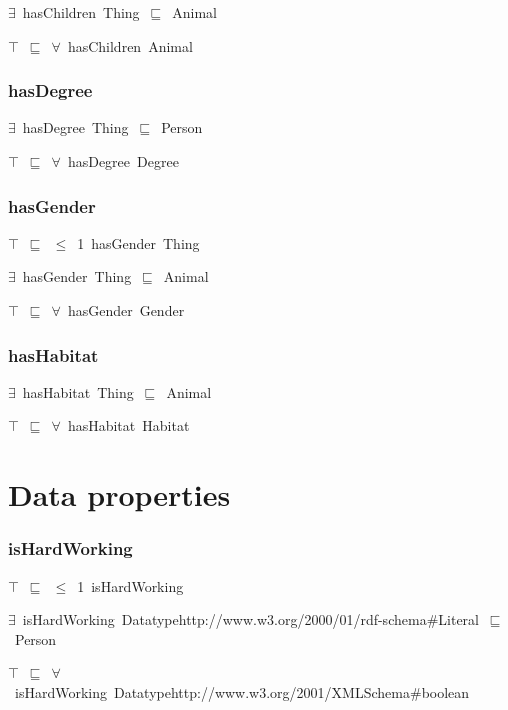 \documentclass{article}
\begin{document}
\ensuremath{\exists}~hasChildren~Thing~\ensuremath{\sqsubseteq}~Animal

\ensuremath{\top}~\ensuremath{\sqsubseteq}~\ensuremath{\forall}~hasChildren~Animal

\subsubsection*{hasDegree}

\ensuremath{\exists}~hasDegree~Thing~\ensuremath{\sqsubseteq}~Person

\ensuremath{\top}~\ensuremath{\sqsubseteq}~\ensuremath{\forall}~hasDegree~Degree

\subsubsection*{hasGender}

\ensuremath{\top}~\ensuremath{\sqsubseteq}~\ensuremath{\leq}~1~hasGender~Thing

\ensuremath{\exists}~hasGender~Thing~\ensuremath{\sqsubseteq}~Animal

\ensuremath{\top}~\ensuremath{\sqsubseteq}~\ensuremath{\forall}~hasGender~Gender

\subsubsection*{hasHabitat}

\ensuremath{\exists}~hasHabitat~Thing~\ensuremath{\sqsubseteq}~Animal

\ensuremath{\top}~\ensuremath{\sqsubseteq}~\ensuremath{\forall}~hasHabitat~Habitat

\section*{Data properties}\subsubsection*{isHardWorking}

\ensuremath{\top}~\ensuremath{\sqsubseteq}~\ensuremath{\leq}~1~isHardWorking

\ensuremath{\exists}~isHardWorking~Datatypehttp://www.w3.org/2000/01/rdf-schema#Literal~\ensuremath{\sqsubseteq}~Person

\ensuremath{\top}~\ensuremath{\sqsubseteq}~\ensuremath{\forall}~isHardWorking~Datatypehttp://www.w3.org/2001/XMLSchema#boolean
\end{document}
